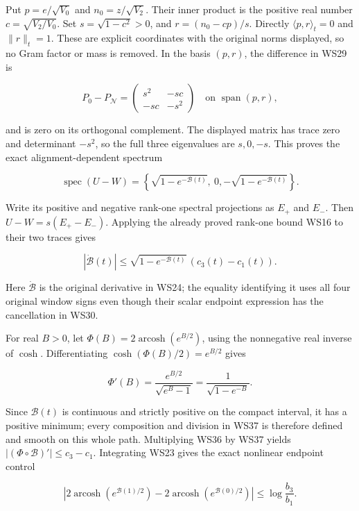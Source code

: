 \documentclass{article}
\begin{document}
Put \(p=e/\sqrt{V_0}\) and \(n_0=z/\sqrt{V_2}\). Their inner product is the positive real number \(c=\sqrt{V_2/V_0}\). Set \(s=\sqrt{1-c^2}>0\), and \(r=(n_0-cp)/s\). Directly \(\langle p,r\rangle_t=0\) and \(\|r\|_t=1\). These are explicit coordinates with the original norms displayed, so no Gram factor or mass is removed. In the basis \((p,r)\), the difference in WS29 is

\[
P_0-P_{\mathcal N}
=\begin{pmatrix}s^2&-sc\\-sc&-s^2\end{pmatrix}
\quad\text{on }\operatorname{span}(p,r),
\tag{WS34}
\]

and is zero on its orthogonal complement. The displayed matrix has trace zero and determinant \(-s^2\), so the full three eigenvalues are \(s,0,-s\). This proves the exact alignment-dependent spectrum

\[
\operatorname{spec}(U-W)
=\left\{\sqrt{1-e^{-\mathcal B(t)}},\ 0,
         -\sqrt{1-e^{-\mathcal B(t)}}\right\}.
\tag{WS35}
\]

Write its positive and negative rank-one spectral projections as \(E_+\) and \(E_-\). Then \(U-W=s(E_+-E_-)\). Applying the already proved rank-one bound WS16 to their two traces gives

\[
|\dot{\mathcal B}(t)|
\le\sqrt{1-e^{-\mathcal B(t)}}\,(c_3(t)-c_1(t)).
\tag{WS36}
\]

Here \(\dot{\mathcal B}\) is the original derivative in WS24; the equality identifying it uses all four original window signs even though their scalar endpoint expression has the cancellation in WS30.

For real \(B>0\), let \(\Phi(B)=2\operatorname{arcosh}(e^{B/2})\), using the nonnegative real inverse of \(\cosh\). Differentiating \(\cosh(\Phi(B)/2)=e^{B/2}\) gives

\[
\Phi'(B)=\frac{e^{B/2}}{\sqrt{e^B-1}}
=\frac1{\sqrt{1-e^{-B}}}.
\tag{WS37}
\]

Since \(\mathcal B(t)\) is continuous and strictly positive on the compact interval, it has a positive minimum; every composition and division in WS37 is therefore defined and smooth on this whole path. Multiplying WS36 by WS37 yields \(|(\Phi\circ\mathcal B)'|\le c_3-c_1\). Integrating WS23 gives the exact nonlinear endpoint control

\[
\boxed{
\left|2\operatorname{arcosh}(e^{\mathcal B(1)/2})
      -2\operatorname{arcosh}(e^{\mathcal B(0)/2})\right|
\le\log\frac{b_3}{b_1}.
}
\tag{WS38}
\]
\end{document}
